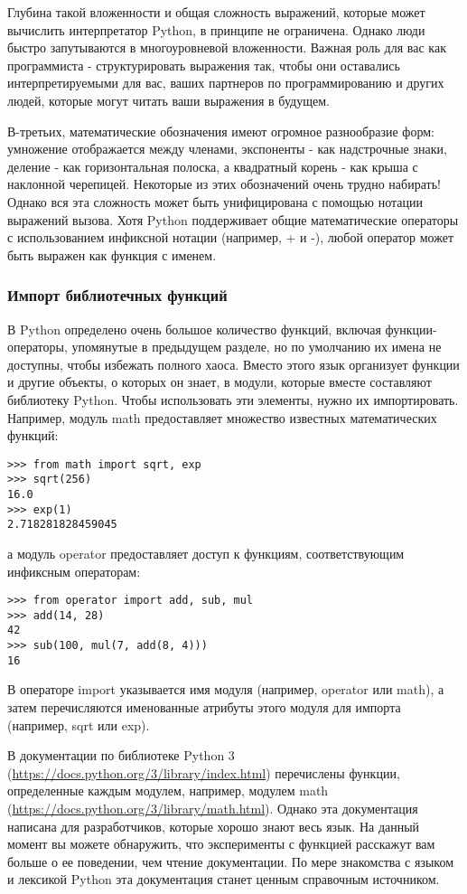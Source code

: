 Глубина такой вложенности и общая сложность выражений, которые может вычислить интерпретатор Python, в принципе не ограничена. Однако люди быстро запутываются в многоуровневой вложенности. Важная роль для вас как программиста - структурировать выражения так, чтобы они оставались интерпретируемыми для вас, ваших партнеров по программированию и других людей, которые могут читать ваши выражения в будущем.

В-третьих, математические обозначения имеют огромное разнообразие форм: умножение отображается между членами, экспоненты - как надстрочные знаки, деление - как горизонтальная полоска, а квадратный корень - как крыша с наклонной черепицей. Некоторые из этих обозначений очень трудно набирать! Однако вся эта сложность может быть унифицирована с помощью нотации выражений вызова. Хотя Python поддерживает общие математические операторы с использованием инфиксной нотации (например, + и -), любой оператор может быть выражен как функция с именем.

\subsubsection{Импорт библиотечных функций}
В Python определено очень большое количество функций, включая функции-операторы, упомянутые в предыдущем разделе, но по умолчанию их имена не доступны, чтобы избежать полного хаоса. Вместо этого язык организует функции и другие объекты, о которых он знает, в модули, которые вместе составляют библиотеку Python. Чтобы использовать эти элементы, нужно их импортировать. Например, модуль math предоставляет множество известных математических функций:
\begin{verbatim}
>>> from math import sqrt, exp
>>> sqrt(256)
16.0
>>> exp(1)
2.718281828459045
  \end{verbatim}

а модуль operator предоставляет доступ к функциям, соответствующим инфиксным операторам:
\begin{verbatim}
>>> from operator import add, sub, mul
>>> add(14, 28)
42
>>> sub(100, mul(7, add(8, 4)))
16
  \end{verbatim}

В операторе import указывается имя модуля (например, operator или math), а затем перечисляются именованные атрибуты этого модуля для импорта (например, sqrt или exp).

В документации по библиотеке Python 3 (\url{https://docs.python.org/3/library/index.html}) перечислены функции, определенные каждым модулем, например, модулем math (\url{https://docs.python.org/3/library/math.html}).
Однако эта документация написана для разработчиков, которые хорошо знают весь язык.
На данный момент вы можете обнаружить, что эксперименты с функцией расскажут вам больше о ее поведении, чем чтение документации.
По мере знакомства с языком и лексикой Python эта документация станет ценным справочным источником.


